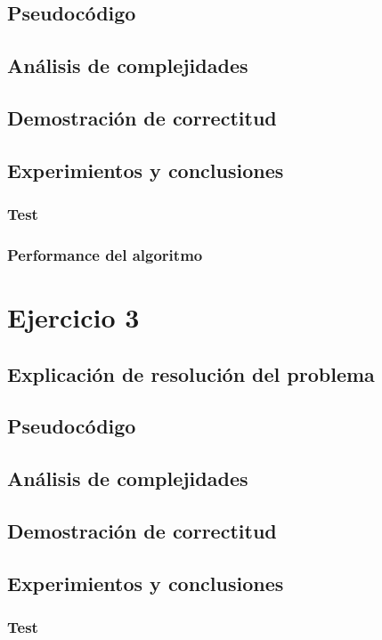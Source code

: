 \documentclass[12pt, a4paper]{article}
\begin{document}
\subsection{Pseudoc\'odigo}

\subsection{An\'alisis de complejidades}

\subsection{Demostraci\'on de correctitud}

\subsection{Experimientos y conclusiones}
\subsubsection[2.5]{Test}
%
\subsubsection[2.5]{Performance del algoritmo}
%

\newpage
\section{Ejercicio 3} 
\subsection{Explicaci\'on de resoluci\'on del problema}

\subsection{Pseudoc\'odigo}

\subsection{An\'alisis de complejidades}

\subsection{Demostraci\'on de correctitud}

\subsection{Experimientos y conclusiones}
\subsubsection[2.5]{Test}
%
\end{document}
